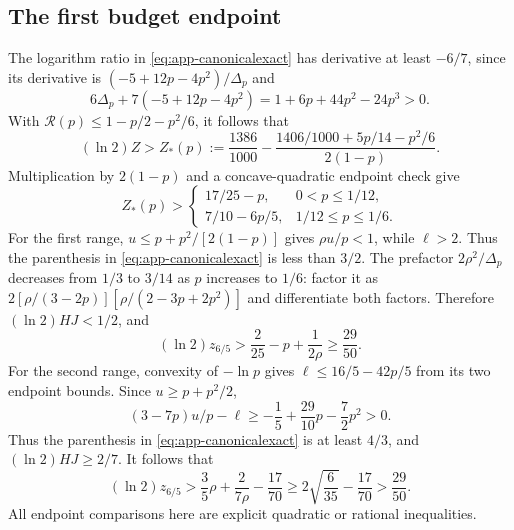 \subsection*{The first budget endpoint}
The logarithm ratio in \eqref{eq:app-canonicalexact} has derivative at least
$-6/7$, since its derivative is $(-5+12p-4p^2)/\Delta_p$ and
\[
 6\Delta_p+7(-5+12p-4p^2)=1+6p+44p^2-24p^3>0.
\]
With $\mathcal R(p)\le1-p/2-p^2/6$, it follows that
\[
 (\ln2)Z>Z_*(p):=\frac{1386}{1000}
 -\frac{1406/1000+5p/14-p^2/6}{2(1-p)}.
\]
Multiplication by $2(1-p)$ and a concave-quadratic endpoint check give
\[
 Z_*(p)>\begin{cases}
 17/25-p,&0<p\le1/12,\\
 7/10-6p/5,&1/12\le p\le1/6.
 \end{cases}
\]
For the first range, $u\le p+p^2/[2(1-p)]$ gives $\rho u/p<1$, while $\ell>2$.
Thus the parenthesis in \eqref{eq:app-canonicalexact} is less than $3/2$. The
prefactor $2\rho^2/\Delta_p$ decreases from $1/3$ to $3/14$ as $p$ increases to
$1/6$: factor it as $2[\rho/(3-2p)][\rho/(2-3p+2p^2)]$ and differentiate both
factors. Therefore $(\ln2)HJ<1/2$, and
\[
 (\ln2)z_{6/5}>\frac2{25}-p+\frac1{2\rho}\ge\frac{29}{50}.
\]
For the second range, convexity of $-\ln p$ gives $\ell\le16/5-42p/5$ from
its two endpoint bounds. Since $u\ge p+p^2/2$,
\[
 (3-7p)u/p-\ell\ge-\frac15+\frac{29}{10}p-\frac72p^2>0.
\]
Thus the parenthesis in \eqref{eq:app-canonicalexact} is at least $4/3$, and
$(\ln2)HJ\ge2/7$. It follows that
\[
 (\ln2)z_{6/5}>\frac35\rho+\frac2{7\rho}-\frac{17}{70}
 \ge2\sqrt{\frac6{35}}-\frac{17}{70}>\frac{29}{50}.
\]
All endpoint comparisons here are explicit quadratic or rational inequalities.

